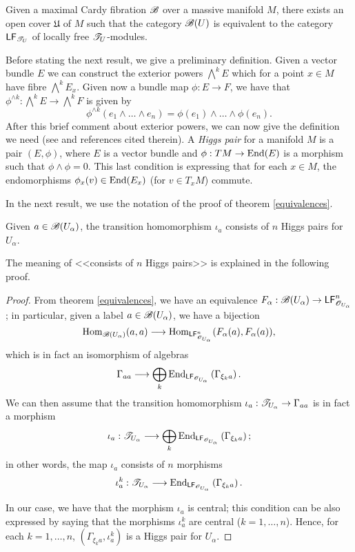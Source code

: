 \begin{cor}
Given a  maximal Cardy fibration $\mathscr{B}$ over a massive manifold $M$, there exists an open cover $\mathfrak{U}$ of $M$ such that the category $\mathscr{B}(U)$ is equivalent to the category $\mathsf{LF}_{\mathscr{T}_U}$ of locally free $\mathscr{T}_U$-modules. 
\end{cor}

Before stating the next result, we give a preliminary definition. Given a vector bundle $E$ we can construct the exterior powers $\bigwedge^kE$ which for a point $x\in M$ have fibre $\bigwedge^kE_x$. Given now a bundle map $\phi :E\to F$, we have that $\phi^{\wedge k}:\bigwedge^kE\to \bigwedge^kF$ is given by
$$\phi^{\wedge k}(e_1\wedge \dots \wedge e_n)=\phi (e_1)\wedge \dots \wedge \phi (e_n).$$
After this brief comment about exterior powers, we can now give the definition we need (see \cite{audin:frob} and references cited therein). A \emph{Higgs pair} for a manifold $M$ is a pair $(E,\phi )$, where $E$ is a vector bundle and $\phi :TM\to \operatorname{End}(E)$ is a morphism such that $\phi \wedge \phi =0$. This last condition is expressing that for each $x\in M$, the endomorphisms $\phi_x(v)\in \operatorname{End}(E_x)$ (for $v\in T_xM$) commute.

In the next result, we use the notation of the proof of theorem \ref{equivalences}.

\begin{cor}
Given $a\in \mathscr{B}(U_\alpha )$, the transition homomorphism $\iota_a$ consists of $n$ Higgs pairs for $U_\alpha$.
\end{cor}

The meaning of <<consists of $n$ Higgs pairs>> is explained in the following proof.

\begin{proof}
From theorem \ref{equivalences}, we have an equivalence $F_\alpha :\mathscr{B}(U_\alpha )\to \mathsf{LF}_{\mathscr{O}_{U_\alpha}}^n$; in particular, given a label $a\in \mathscr{B}(U_\alpha )$, we have a bijection
$$\operatorname{Hom}_{\mathscr{B}(U_\alpha )}(a,a)\longrightarrow \operatorname{Hom}_{\mathsf{LF}_{\mathscr{O}_{U_\alpha}}^n}(F_\alpha (a),F_\alpha (a)),$$
which is in fact an isomorphism of algebras
$$\Gamma_{aa}\longrightarrow \bigoplus_k\operatorname{End}_{\mathsf{LF}_{\mathscr{O}_{U_\alpha}}}\left (\Gamma_{\xi_k a}\right ).$$
We can then assume that the transition homomorphism $\iota_a:\mathscr{T}_{U_\alpha }\to \Gamma_{aa}$ is in fact a morphism
$$\iota_a:\mathscr{T}_{U_\alpha }\longrightarrow \bigoplus_k\operatorname{End}_{\mathsf{LF}_{\mathscr{O}_{U_\alpha}}}\left (\Gamma_{\xi_k a}\right );$$
in other words, the map $\iota_a$ consists of $n$ morphisms
$$\iota_a^k :\mathscr{T}_{U_\alpha }\longrightarrow \operatorname{End}_{\mathsf{LF}_{\mathscr{O}_{U_\alpha}}}\left (\Gamma_{\xi_k a}\right ).$$

In our case, we have that the morphism $\iota_a$ is central; this condition can be also expressed by saying that the morphisms $\iota_a^k$ are central ($k=1,\dots ,n$). Hence, for each $k=1,\dots ,n$, $\left (\Gamma_{\xi_ka},\iota_a^k\right )$ is a Higgs pair for $U_\alpha$.
\end{proof}

